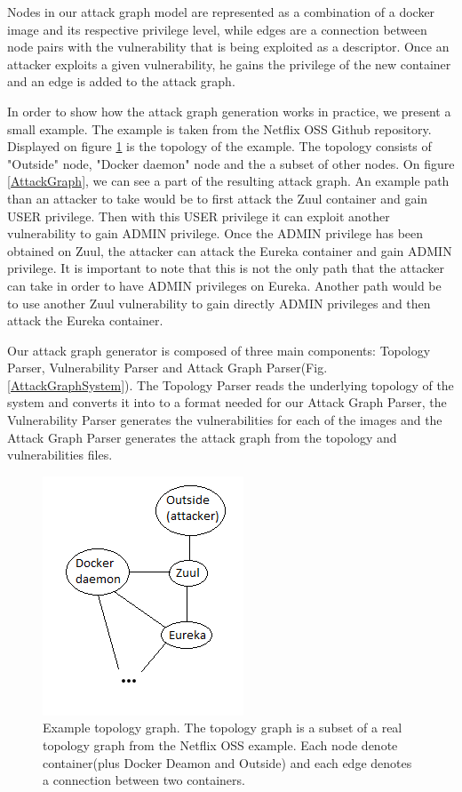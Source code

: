 Nodes in our attack graph model are represented as a combination of a docker image and its respective privilege level, while edges are a connection between node pairs with the vulnerability that is being exploited as a descriptor. Once an attacker exploits a given vulnerability, he gains the privilege of the new container and an edge is added to the attack graph.

In order to show how the attack graph generation works in practice, we present a small example. The example is taken from the Netflix OSS Github repository.\cite{netflixoss} Displayed on figure \ref{TopologyGraph} is the topology of the example. The topology consists of "Outside" node, "Docker daemon" node and the a subset of other nodes. On figure \ref{AttackGraph}, we can see a part of the resulting attack graph. An example path than an attacker to take would be to first attack the Zuul container and gain USER privilege. Then with this USER privilege it can exploit another vulnerability to gain ADMIN privilege. Once the ADMIN privilege has been obtained on Zuul, the attacker can attack the Eureka container and gain ADMIN privilege. It is important to note that this is not the only path that the attacker can take in order to have ADMIN privileges on Eureka. Another path would be to use another Zuul vulnerability to gain directly ADMIN privileges and then attack the Eureka container.

Our attack graph generator is composed of three main components: Topology Parser, Vulnerability Parser and Attack Graph Parser(Fig. \ref{AttackGraphSystem}). The Topology Parser reads the underlying topology of the system and converts it into to a format needed for our Attack Graph Parser, the Vulnerability Parser generates the vulnerabilities for each of the images and the Attack Graph Parser generates the attack graph from the topology and vulnerabilities files. 

\begin{figure}
	\includegraphics[]{./images/Topology_graph}
	\caption{Example topology graph. The topology graph is a subset of a real topology graph from the Netflix OSS example. Each node denote container(plus Docker Deamon and Outside) and each edge denotes a connection between two containers.}
	\label{TopologyGraph}
\end{figure}

